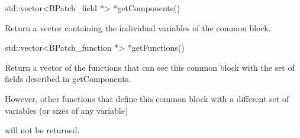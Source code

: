 




\bigskip



{

std::vector<BPatch_field *> *getComponents()}



{

Return a vector containing the individual variables of the common block.}



{

std::vector<BPatch_function *> *getFunctions()}



{

Return a vector of the functions that can see this common block with the set of fields described in getComponents.

However, other functions that define this common block with a different set of variables (or sizes of any variable)

will not be returned.}



